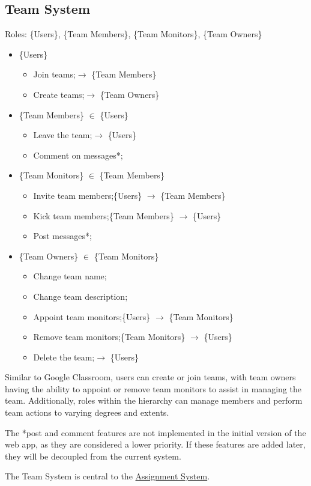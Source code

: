\documentclass[12pt]{report}
\newcommand{\n}{\par}
\newcommand{\br}{\n\vspace{1 em}\n}
\begin{document}
\subsection{Team System} \label{overview.project-objectives.team-system}
Roles: \{Users\}, \{Team Members\}, \{Team Monitors\}, \{Team Owners\}\n
\begin{itemize}
	\item \{Users\}
	      \begin{itemize}
		      \item Join teams;\null\hfill $\rightarrow$ \{Team Members\}
		      \item Create teams;\null\hfill $\rightarrow$ \{Team Owners\}
	      \end{itemize}
	\item \{Team Members\} $\in$ \{Users\}
	      \begin{itemize}
		      \item Leave the team;\null\hfill $\rightarrow$ \{Users\}
		      \item Comment on messages*;
	      \end{itemize}
	\item \{Team Monitors\} $\in$ \{Team Members\}
	      \begin{itemize}
		      \item Invite team members;\null\hfill \{Users\} $\rightarrow$ \{Team Members\}
		      \item Kick team members;\null\hfill \{Team Members\} $\rightarrow$ \{Users\}
		      \item Post messages*;
	      \end{itemize}
	\item \{Team Owners\} $\in$ \{Team Monitors\}
	      \begin{itemize}
		      \item Change team name;
		      \item Change team description;
		      \item Appoint team monitors;\null\hfill \{Users\} $\rightarrow$ \{Team Monitors\}
		      \item Remove team monitors;\null\hfill \{Team Monitors\} $\rightarrow$ \{Users\}
		      \item Delete the team;\null\hfill $\rightarrow$ \{Users\}
	      \end{itemize}
\end{itemize}\n
Similar to Google Classroom, users can create or join teams,
with team owners having the ability to appoint or remove team monitors to assist in managing the team.
Additionally, roles within the hierarchy can manage members and perform team actions to varying degrees and extents.
\br
The *post and comment features are not implemented in the initial version of the web app, as they are considered a lower priority.
If these features are added later, they will be decoupled from the current system.
\br
The Team System is central to the \hyperref[overview.project-objectives.assignment-system]{Assignment System}.
\end{document}

